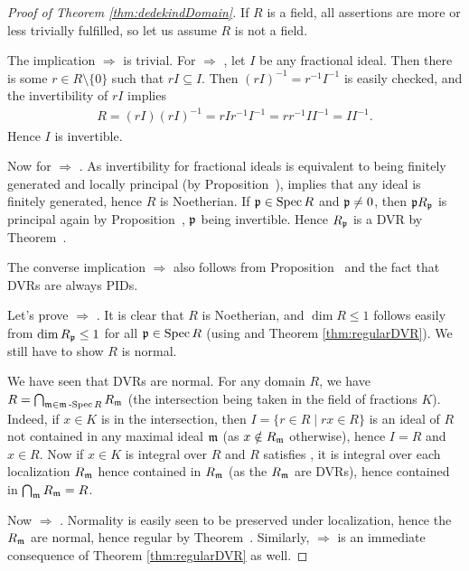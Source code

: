 \documentclass[a4paper,parskip=half,numbers=enddot, DIV=12, headheight=30pt]{scrreprt}
\begin{document}
\begin{proof}[Proof of Theorem \ref{thm:dedekindDomain}]
If $R$ is a field, all assertions are more or less trivially fulfilled, so let us assume $R$ is not a field.

The implication  $\Rightarrow$  is trivial. For  $\Rightarrow$ , let $I$ be any fractional ideal. Then there is some $r\in R\setminus\{0\}$ such
that $rI\subseteq I$. Then $(rI)^{-1} = r^{-1} I^{-1}$ is easily checked,
and the invertibility of $rI$ implies
\begin{align*}
R = (rI)(rI)^{-1} = r I r^{-1} I^{-1} = rr^{-1} I I^{-1} = I I^{-1}.
\end{align*}
Hence $I$ is invertible.

Now for  $\Rightarrow$ . As invertibility for fractional ideals is equivalent to being finitely generated and locally principal
(by Proposition~),
 implies that any ideal is finitely generated, hence
$R$ is Noetherian. If $\mathfrak{p} \in \operatorname{Spec} R$ and $\mathfrak{p}\neq 0$, then  $\mathfrak{p} R_{\mathfrak{p}}$ is principal again by Proposition~, $\mathfrak{p}$ being invertible.  Hence $R_{\mathfrak{p}}$ is a DVR by Theorem~. 

The converse implication  $\Rightarrow$  also follows from Proposition~ and the fact that DVRs are always PIDs.

Let's prove  $\Rightarrow$ . It is clear that $R$ is Noetherian, and $\dim R\leq 1$ follows easily from
$\dim R_{\mathfrak{p}}\leq 1$ for all $\mathfrak{p}\in \operatorname{Spec} R$ (using  and Theorem \ref{thm:regularDVR}). We still have to show $R$ is normal.

We have seen that DVRs are normal. For any domain $R$, we have $R=\bigcap_{\mathfrak{m} \in \mathfrak{m}\operatorname{-Spec} R} R_{\mathfrak{m}}$ (the intersection being
taken in the field of fractions $K$). Indeed, if $x\in K$
is in the intersection, then $I=\{r\in R \mid rx\in R\}$ is an ideal of $R$ not contained
in any maximal ideal $\mathfrak{m}$ (as $x\notin R_{\mathfrak{m}}$ otherwise), hence $I=R$ and $x\in R$. 
Now if $x\in K$ is integral over $R$ and $R$ satisfies , it is integral over each localization $R_{\mathfrak{m}}$ hence contained in $R_{\mathfrak{m}}$ (as the $R_{\mathfrak{m}}$ are DVRs),
hence contained in $\bigcap_{\mathfrak{m}} R_{\mathfrak{m}} = R$.

Now  $\Rightarrow$ . Normality is easily seen to be preserved under localization, hence the $R_{\mathfrak{m}}$ are normal, hence
regular by Theorem~. Similarly,  $\Rightarrow$  is an immediate consequence of Theorem \ref{thm:regularDVR} as well.


\end{proof}
\end{document}
